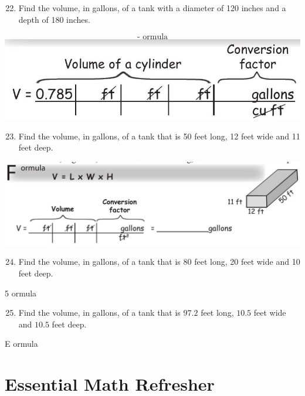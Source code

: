 \documentclass[10pt]{article}
\begin{document}
\begin{enumerate}
  \setcounter{enumi}{21}
  \item Find the volume, in gallons, of a tank with a diameter of 120 inches and a depth of 180 inches.
\end{enumerate}
$$
\text { - ormula }
$$
\includegraphics[max width=\textwidth]{2022_09_16_4d34b76b97ee13a67df7g-22(1)}

\begin{enumerate}
  \setcounter{enumi}{22}
  \item Find the volume, in gallons, of a tank that is 50 feet long, 12 feet wide and 11 feet deep.
\end{enumerate}
\includegraphics[max width=\textwidth]{2022_09_16_4d34b76b97ee13a67df7g-23}

\begin{enumerate}
  \setcounter{enumi}{23}
  \item Find the volume, in gallons, of a tank that is 80 feet long, 20 feet wide and 10 feet deep.
\end{enumerate}
5 ormula

\begin{enumerate}
  \setcounter{enumi}{24}
  \item Find the volume, in gallons, of a tank that is $97.2$ feet long, $10.5$ feet wide and $10.5$ feet deep.
\end{enumerate}
E ormula

\section{Essential Math Refresher}
\end{document}
